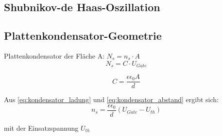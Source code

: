 \subsection{Shubnikov-de Haas-Oszillation}

\subsection{Plattenkondensator-Geometrie}

Plattenkondensator der Fläche A: $N_s=n_s \cdot A$ 
\begin{equation}
N_s=C \cdot U_{Gate}
\label{eq:kondensator_ladung}
\end{equation}

\begin{equation}
C=\frac{\epsilon \epsilon_0 A}{d}
\label{eq:kondensator_abstand}
\end{equation}


Aus \ref{eq:kondensator_ladung} und \ref{eq:kondensator_abstand} ergibt sich:
\begin{equation}
n_s=\frac{\epsilon \epsilon_0}{d}(U_{Gate}-U_{th})
\label{eq:kondens_lad_und_abst}
\end{equation}

mit der Einsatzspannung $U_{th}$



